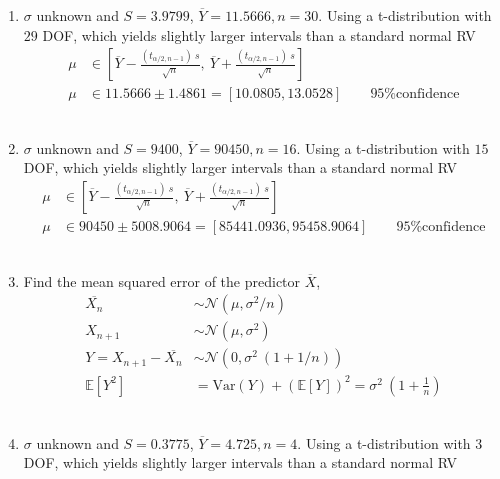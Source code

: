 \begin{enumerate}
	
	\item $ \sigma $ unknown and $ S = 3.9799 $, $ \overline{Y} = 11.5666, n = 30$. Using a t-distribution with $ 29 $ DOF, which yields slightly larger intervals than a standard normal RV\\
	
		\begin{align}
			\mu &\in \left[ \overline{Y} - \frac{(t_{\alpha/2, n-1})\ s}{\sqrt{n}}, \ \overline{Y} + \frac{(t_{\alpha/2, n-1})\ s}{\sqrt{n}} \right] \nonumber \\
			\mu &\in 11.5666 \pm 1.4861 = [10.0805, 13.0528] \qquad \text{95\% confidence} 
		\end{align}\\
	
	
	\item $ \sigma $ unknown and $ S = 9400 $, $ \overline{Y} = 90450, n = 16$. Using a t-distribution with $ 15 $ DOF, which yields slightly larger intervals than a standard normal RV\\
	
		\begin{align}
			\mu &\in \left[ \overline{Y} - \frac{(t_{\alpha/2, n-1})\ s}{\sqrt{n}}, \ \overline{Y} + \frac{(t_{\alpha/2, n-1})\ s}{\sqrt{n}} \right] \nonumber \\
			\mu &\in 90450 \pm 5008.9064 = [85441.0936, 95458.9064] \qquad \text{95\% confidence} 
		\end{align}\\
	
	
	\item Find the mean squared error of the predictor $ \overline{X} $, \\
	
		\begin{align}
			\overline{X_n} &\sim \mathcal{N}(\mu, \sigma^2/n) \nonumber \\
			X_{n+1} &\sim \mathcal{N}(\mu, \sigma^2) \nonumber \\
			Y = X_{n+1} - \overline{X_n} &\sim \mathcal{N}(0, \sigma^2\ (1+1/n))\nonumber \\
			\mathbb{E}[Y^2] &= \mathrm{Var}(Y) + \left(\mathbb{E}[Y]\right)^2 = \sigma^2\ \left(1+\frac{1}{n}\right)
		\end{align}\\
	
	
	\item $ \sigma $ unknown and $ S = 0.3775 $, $ \overline{Y} = 4.725, n = 4$. Using a t-distribution with $ 3 $ DOF, which yields slightly larger intervals than a standard normal RV\\
	

\end{enumerate}
